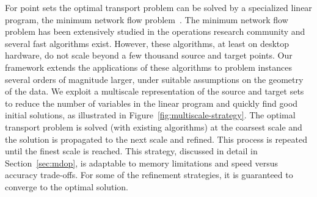 \documentclass[twoside,11pt]{article}
\begin{document}
For point sets the optimal transport problem can be solved by a specialized
linear program, the minimum network flow
problem~\citep{Ahuja:1993:NFT:137406,Tarjan1997}. The minimum network flow
problem has been extensively studied in the operations research community and
several fast algorithms exist. However, these algorithms, at least on desktop
hardware, do not scale beyond a few thousand source and target points.  Our
framework extends the applications of these algorithms to problem instances
several orders of magnitude larger, under suitable assumptions on the geometry
of the data.  We exploit a multiscale representation of the source and target
sets to reduce the number of variables in the linear program and quickly find
good initial solutions, as illustrated in Figure~\ref{fig:multiscale-strategy}.
The optimal transport problem is solved (with existing algorithms) at the
coarsest scale and the solution is propagated to the next scale and refined.
This process is repeated until the finest scale is reached. This strategy,
discussed in detail in Section~\ref{sec:mdop}, is adaptable to memory
limitations and speed versus accuracy trade-offs. For some of the refinement
strategies, it is guaranteed to converge to the optimal solution.
\end{document}
